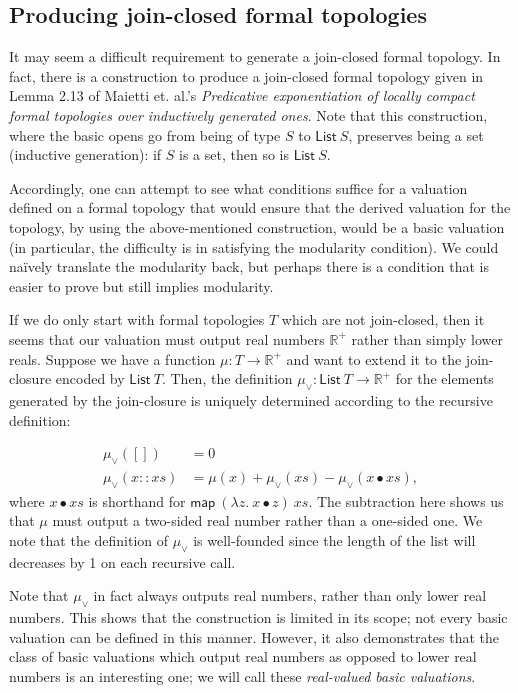 \documentclass{article}           %
\newcommand{\R}{\mathbb{R}}
\newcommand{\List}[1]{\mathsf{List}\ {#1}}
\newcommand{\map}[2]{\mathsf{map}\ {#1}\ {#2}}
\newcommand{\fun}[2]{\lambda {#1}.\  {#2}}
\begin{document}
\subsection{Producing join-closed formal topologies}

It may seem a difficult requirement to generate a join-closed formal topology. In fact, there is a construction to produce a join-closed formal topology given in Lemma 2.13 of Maietti et. al.'s \emph{Predicative exponentiation of locally compact formal topologies over inductively generated ones}. Note that this construction, where the basic opens go from being of type $S$ to $\List{S}$, preserves being a set (inductive generation): if $S$ is a set, then so is $\List{S}$.

Accordingly, one can attempt to see what conditions suffice for a valuation defined on a formal topology that would ensure that the derived valuation for the topology, by using the above-mentioned construction, would be a basic valuation (in particular, the difficulty is in satisfying the modularity condition). We could na\"ively translate the modularity back, but perhaps there is a condition that is easier to prove but still implies modularity.


If we do only start with formal topologies $T$ which are not join-closed, then it seems that our valuation must output real numbers $\R^+$ rather than simply lower reals. Suppose we have a function $\mu : T \to \R^+$ and want to extend it to the join-closure encoded by $\List{T}$. Then, the definition $\mu_\vee : \List{T} \to \R^+$ for the elements generated by the join-closure is uniquely determined according to the recursive definition:

\begin{align*}
\mu_\vee([]) &= 0
\\ \mu_\vee(x :: xs) &= \mu(x) + \mu_\vee(xs) - \mu_\vee(x \bullet xs),
\end{align*}
where $x \bullet xs$ is shorthand for $\map{(\fun{z}{x \bullet z})}{xs}$. The subtraction here shows us that $\mu$ must output a two-sided real number rather than a one-sided one. We note that the definition of $\mu_\vee$ is well-founded since the length of the list will decreases by 1 on each recursive call.

Note that $\mu_\vee$ in fact always outputs real numbers, rather than only lower real numbers. This shows that the construction is limited in its scope; not every basic valuation can be defined in this manner. However, it also demonstrates that the class of basic valuations which output real numbers as opposed to lower real numbers is an interesting one; we will call these \emph{real-valued basic valuations}.
\end{document}

